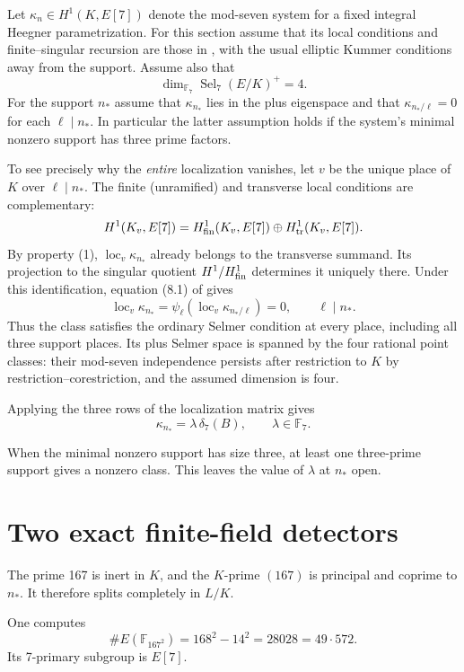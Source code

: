 \documentclass[11pt]{article}
\begin{document}
Let $\kappa_n\in H^1(K,E[7])$ denote the mod-seven system for a
fixed integral Heegner parametrization. For this section assume that
its local conditions and finite--singular recursion are those in
\cite[\S8.1, properties (1)--(2)]{Zhang}, with the usual elliptic
Kummer conditions away from the support. Assume also that
\[
 \dim_{\mathbb F_7}\operatorname{Sel}_7(E/K)^+=4.
\]
For the support $n_*$ assume that $\kappa_{n_*}$ lies in the
plus eigenspace and that $\kappa_{n_*/\ell}=0$ for each
$\ell\mid n_*$. In particular the latter assumption holds if the
system's minimal nonzero support has three prime factors.

To see precisely why the \emph{entire} localization vanishes, let
$v$ be the unique place of $K$ over $\ell\mid n_*$. The finite
(unramified) and transverse local conditions are complementary:
\[
 H^1(K_v,E[7])=H^1_{\rm fin}(K_v,E[7])
                   \oplus H^1_{\rm tr}(K_v,E[7]).
\]
By property (1), $\operatorname{loc}_v\kappa_{n_*}$ already belongs
to the transverse summand. Its projection to the singular quotient
$H^1/H^1_{\rm fin}$ determines it uniquely there. Under this
identification, equation (8.1) of \cite{Zhang} gives
\[
 \operatorname{loc}_v\kappa_{n_*}
 =\psi_\ell(\operatorname{loc}_v\kappa_{n_*/\ell})=0,
 \qquad \ell\mid n_*.
\]
Thus the class satisfies the ordinary Selmer condition at every
place, including all three support places. Its plus Selmer space
is spanned by the four rational point classes: their mod-seven
independence persists after restriction to $K$ by
restriction--corestriction, and the assumed dimension is four.

Applying the three rows of the localization matrix gives
\[
 \boxed{
 \kappa_{n_*}
   =\lambda\,\delta_7(B),
 \qquad\lambda\in\mathbb F_7.
 }
\]

When the minimal nonzero support has size three, at least one
three-prime support gives a nonzero class. This leaves the value
of $\lambda$ at $n_*$ open.

\section{Two exact finite-field detectors}

The prime 167 is inert in $K$, and the
$K$-prime $(167)$ is principal and coprime
to $n_*$. It therefore splits completely
in $L/K$.

One computes
\[
 \#E(\mathbb F_{167^2})
   =168^2-14^2
   =28028=49\cdot572.
\]
Its 7-primary subgroup is $E[7]$.
\end{document}

